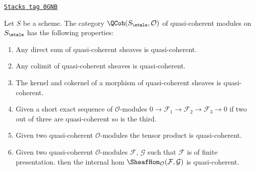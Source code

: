 \begin{lemma}
\label{descent-lemma-properties-quasi-coherent}
\href{https://stacks.math.columbia.edu/tag/0GNB}{\texttt{Stacks tag 0GNB}}

Let $S$ be a scheme. The category $\QCoh(S_\etale, \mathcal{O})$
of quasi-coherent modules on $S_\etale$
has the following properties:
\begin{enumerate}
\item Any direct sum of quasi-coherent sheaves is quasi-coherent.
\item Any colimit of quasi-coherent sheaves is quasi-coherent.
\item The kernel and cokernel of a morphism of quasi-coherent sheaves
is quasi-coherent.
\item Given a short exact sequence of $\mathcal{O}$-modules
$0 \to \mathcal{F}_1 \to \mathcal{F}_2 \to \mathcal{F}_3 \to 0$
if two out of three are quasi-coherent so is the third.
\item Given two quasi-coherent $\mathcal{O}$-modules
the tensor product is quasi-coherent.
\item Given two quasi-coherent $\mathcal{O}$-modules
$\mathcal{F}$, $\mathcal{G}$ such that $\mathcal{F}$
is of finite presentation.
then the internal hom
$\SheafHom_\mathcal{O}(\mathcal{F}, \mathcal{G})$
is quasi-coherent.
\end{enumerate}
\end{lemma}

